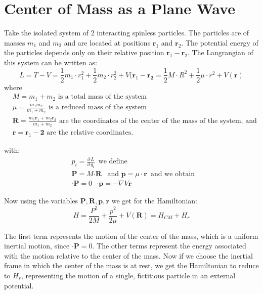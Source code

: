 \chapter{Center of Mass as a Plane Wave}
\label{AppendixA}

Take the isolated system of 2 interacting spinless particles. The particles are of masses $ m_1 $ and $ m_2 $ and are located at positions $ \mathbf{r}_1 $ and $ \mathbf{r}_2 $. The potential energy of the particles depends only on their relative position $ \mathbf{r}_1 - \mathbf{r}_2 $. The Langrangian of this system can be written as:
\begin{equation}
L = T - V = \frac{1}{2}m_1\cdot{r}_1^2 + \frac{1}{2}m_2\cdot{r}_2^2 + V(\mathbf{r}_1 - \mathbf{r_2} = \frac{1}{2}M\cdot{R}^2 + \frac{1}{2}\mu\cdot{r}^2 + V(\mathbf{r})
 \end{equation}
where
\begin{equation}
\begin{split}
& M = m_1 + m_2 \text{ is a total mass of the system}\\[.8em]
& \mu = \frac{m_1m_2}{m_1 + m_2} \text{ is a reduced mass of the system} \\[.8em]
& \mathbf{R} = \frac{m_1\mathbf{r}_1 + m_2\mathbf{r}_2}{m_1 + m_2} \text{ are the coordinates of the center of the mass of the system, and} \\[.8em]
& \mathbf{r} = \mathbf{r}_1 - \mathbf{2} \text{ are the relative coordinates.}
\end{split}
\end{equation}

with:
\begin{equation}
\begin{split}
& p_i = \frac{\partial\,L}{\partial\,q_i}\,\text{ we define } \\[.8em]
& \mathbf{P} = M\mathbf{\cdot{R}}\,\,\,\text{  and  } \mathbf{p} = \mu\cdot\mathbf{r} \,\text{ and we obtain } \\[.8em]& \mathbf{\cdot{P}} = 0\,\,\,\,\mathbf{\cdot{p}} = -\nabla V{\mathbf{r}}
\end{split}
\end{equation}

Now using the variables $ \mathbf{P}, \mathbf{R}, \mathbf{p}, \mathbf{r} $ we get for the Hamiltonian:
\begin{equation}
H = \frac{P^2}{2M} + \frac{p^2}{2\mu} + V(\mathbf{R}) = H_{CM} + H_r
\end{equation}

The first term represents the motion of the center of the mass, which is a uniform inertial motion, since $ \mathbf{\cdot{P}} = 0 $. The other terms represent the energy associated with the motion relative to the center of the mass. Now if we choose the inertial frame in which the center of the mass is at rest, we get the Hamiltonian to reduce to $ H_r $, representing the motion of a single, fictitious particle in an external potential.

